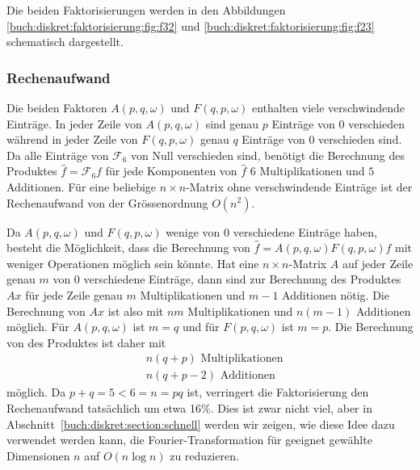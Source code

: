 Die beiden Faktorisierungen werden in den Abbildungen
\ref{buch:diskret:faktorisierung:fig:f32}
und
\ref{buch:diskret:faktorisierung:fig:f23}
schematisch dargestellt.

%
%
\subsubsection{Rechenaufwand}
Die beiden Faktoren $A(p,q,\omega)$ und $F(q,p,\omega)$ enthalten
viele verschwindende Einträge.
In jeder Zeile von $A(p,q,\omega)$ sind genau $p$ Einträge von
$0$ verschieden während in jeder Zeile von $F(q,p,\omega)$ genau
$q$ Einträge von $0$ verschieden sind.
Da alle Einträge von $\mathscr{F}_6$ von Null verschieden sind, benötigt
die Berechnung des Produktes $\hat{f}=\mathscr{F}_6f$ für jede
Komponenten von $\hat{f}$ $6$ Multiplikationen und $5$ Additionen.
Für eine beliebige $n\times n$-Matrix ohne verschwindende Einträge
ist der Rechenaufwand von der Grössenordnung $O(n^2)$.

Da $A(p,q,\omega)$ und $F(q,p,\omega)$ wenige von $0$ verschiedene
Einträge haben, besteht die Möglichkeit, dass die Berechnung
von $\hat{f}=A(p,q,\omega)F(q,p,\omega)f$ mit weniger Operationen
möglich sein könnte.
Hat eine $n\times n$-Matrix $A$ auf jeder Zeile genau $m$ von $0$
verschiedene Einträge, dann sind zur Berechnung des Produktes $Ax$
für jede Zeile genau $m$ Multiplikationen und $m-1$ Additionen
nötig.
Die Berechnung von $Ax$ ist also mit $nm$ Multiplikationen und 
$n(m-1)$ Additionen möglich.
Für $A(p,q,\omega)$ ist $m=q$ und für $F(p,q,\omega)$ ist $m=p$.
Die Berechnung von des Produktes ist daher mit
\begin{align*}
&n(q+p)\text{ Multiplikationen}
\\
&n(q+p-2)\text{ Additionen}
\end{align*}
möglich.
Da $p+q=5<6=n=pq$ ist, verringert die Faktorisierung den Rechenaufwand
tatsächlich um etwa 16\%.
Dies ist zwar nicht viel, aber in Abschnitt~\ref{buch:diskret:section:schnell}
werden wir zeigen, wie diese Idee dazu verwendet werden kann, die
Fourier-Transformation für geeignet gewählte Dimensionen $n$ auf
$O(n\log n)$ zu reduzieren.

